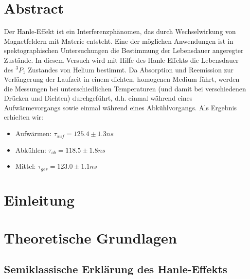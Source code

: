 \documentclass[12pt]{article}
\title{\vspace{0cm}{\Huge Fortgeschrittenen-Praktikum I:\\ \vspace{1cm} Der Hanle-Effekt}}
\author{Saskia Bondza\\Simon Stephan}
\date{durchgeführt am 28. und 29.09.2016}
\begin{document}
\maketitle
\newpage

\section*{Abstract}

Der Hanle-Effekt ist ein Interferenzphänomen, das durch Wechselwirkung von Magnetfeldern mit Materie entsteht. Eine der möglichen Anwendungen ist in spektographischen Untersuchungen die Bestimmung der Lebensdauer angeregter Zustände. In diesem Versuch wird mit Hilfe des Hanle-Effekts die Lebensdauer des $^3P_1$ Zustandes von Helium bestimmt. Da Absorption und Reemission zur Verlängerung der Laufzeit in einem dichten, homogenen Medium führt, werden die Messungen bei unterschiedlichen Temperaturen (und damit bei verschiedenen Drücken und Dichten) durchgeführt, d.h. einmal während eines Aufwärmevorgangs sowie einmal während eines Abkühlvorgangs. Als Ergebnis erhielten wir:
\begin{itemize}
	\item Aufwärmen: $\tau_{auf} = 125.4 \pm 1.3 ns$
	\item Abkühlen: $\tau_{ab} = 118.5 \pm 1.8 ns$
	\item Mittel: $\tau_{ges} = 123.0 \pm 1.1 ns$
\end{itemize}

\newpage

\thispagestyle{empty}
\tableofcontents
\newpage

\section{Einleitung}





\newpage
\section{Theoretische Grundlagen}

\subsection{Semiklassische Erklärung des Hanle-Effekts}
\end{document}

